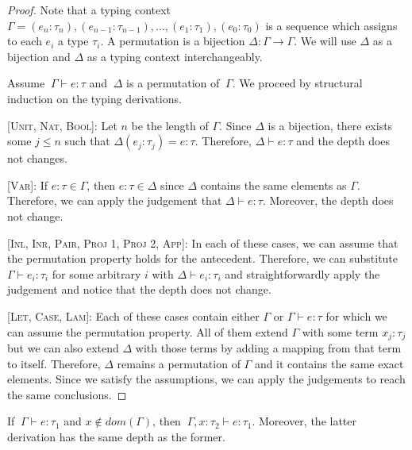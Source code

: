 \documentclass[nonacm]{acmart}
\begin{document}
  \begin{proof}
    Note that a typing context $\Gamma = (e_n : \tau_n), (e_{n - 1} : \tau_{n - 1}), \dots,
    (e_1 : \tau_1), (e_0 : \tau_0)$ is a sequence which assigns to each $e_i$ a type $\tau_i$.
    A permutation is a bijection $\Delta : \Gamma \rightarrow \Gamma$. We will use
    $\Delta$ as a bijection and $\Delta$ as a typing context interchangeably.

    Assume $~\Gamma \vdash e : \tau$ and $~\Delta$ is a permutation of $~\Gamma$.
    We proceed by structural induction on the typing derivations.

    [\textsc{Unit, Nat, Bool}]: Let $n$ be the length of $\Gamma$. Since $\Delta$ is a bijection,
    there exists some $j \leq n$ such that $\Delta(e_j : \tau_j) = e : \tau$.
    Therefore, $\Delta \vdash e : \tau$ and the depth does not changes.

    [\textsc{Var}]: If $e : \tau \in \Gamma$, then $e : \tau \in \Delta$ since
    $\Delta$ contains the same elements as $\Gamma$. Therefore, we can apply the
    judgement that $\Delta \vdash e : \tau$. Moreover, the depth does not change.

    [\textsc{Inl, Inr, Pair, Proj 1, Proj 2, App}]: In each of these cases, we can
    assume that the permutation property holds for the antecedent. Therefore,
    we can substitute $\Gamma \vdash e_{i} : \tau_{i}$ for some arbitrary $i$ with
    $\Delta \vdash e_{i} : \tau_{i}$ and straightforwardly apply the judgement
    and notice that the depth does not change.

    [\textsc{Let, Case, Lam}]: Each of these cases contain either $\Gamma$ or
    $\Gamma \vdash e : \tau$ for which we can assume the permutation property.
    All of them extend $\Gamma$ with some term $x_j : \tau_j$ but we can also
    extend $\Delta$ with those terms by adding a mapping from that term to itself.
    Therefore, $\Delta$ remains a permutation of $\Gamma$ and it contains the same
    exact elements. Since we satisfy the assumptions, we can apply the judgements
    to reach the same conclusions.
  \end{proof}

  \begin{lemma}[Weakening]
    If $~\Gamma \vdash e : \tau_1$ and $x \notin dom(\Gamma)$, then $~\Gamma, x : \tau_2
    \vdash e : \tau_1$. Moreover, the latter derivation has the same depth as
    the former.
  \end{lemma}
\end{document}
